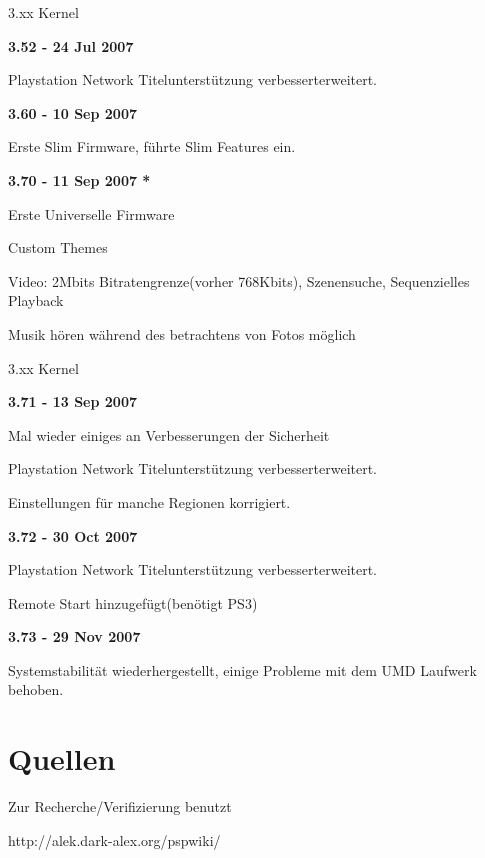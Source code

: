 \documentclass[mode=print,paper=screen,style=jefka]{powerdot}
\newcommand{\Anf}[1]{\glqq #1\grqq}
\begin{document}
\begin{slide}{3.xx Kernel}
	\begin{large}\textbf{3.52 - 24 Jul 2007}\end{large}
	\begin{list}{-}{}
		\item{Playstation Network Titelunterstützung verbessert\/erweitert.}
	\end{list}
	\begin{large}\textbf{3.60 - 10 Sep 2007}\end{large}
	\begin{list}{-}{}
		\item{Erste Slim Firmware, führte Slim Features ein.}
	\end{list}
	\begin{large}\textbf{3.70 - 11 Sep 2007 *}\end{large}
	\begin{list}{-}{}
		\item{Erste Universelle Firmware}
		\item{Custom Themes}
		\item{Video: 2Mbit\/s Bitratengrenze(vorher 768Kbit\/s), Szenensuche, Sequenzielles Playback}
		\item{Musik hören während des betrachtens von Fotos möglich} 
	\end{list}
\end{slide}

\begin{slide}{3.xx Kernel}
	\begin{large}\textbf{3.71 - 13 Sep 2007}\end{large}
	\begin{list}{-}{}
		\item{Mal wieder einiges an Verbesserungen der \Anf{Sicherheit}}
		\item{Playstation Network Titelunterstützung verbessert\/erweitert.}
		\item{Einstellungen für manche Regionen korrigiert.}
	\end{list}
	\begin{large}\textbf{3.72 - 30 Oct 2007}\end{large}
	\begin{list}{-}{}
		\item{Playstation Network Titelunterstützung verbessert\/erweitert.}
		\item{Remote Start hinzugefügt(benötigt PS3)}
	\end{list}
	\begin{large}\textbf{3.73 - 29 Nov 2007}\end{large}
	\begin{list}{-}{}
		\item{Systemstabilität wiederhergestellt, einige Probleme mit dem UMD Laufwerk behoben.}
	\end{list}
\end{slide}



\section{Quellen}
\begin{slide}{Zur Recherche/Verifizierung benutzt}
	\begin{list}{-}{}
		\item{http://alek.dark-alex.org/pspwiki/}
	\end{list}
\end{slide}
\end{document}
